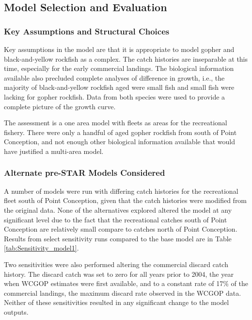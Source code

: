 \documentclass[12pt,]{article}
\begin{document}
\subsection{Model Selection and
Evaluation}\label{model-selection-and-evaluation}

\subsubsection{Key Assumptions and Structural
Choices}\label{key-assumptions-and-structural-choices}

Key assumptions in the model are that it is appropriate to model gopher
and black-and-yellow rockfish as a complex. The catch histories are
inseparable at this time, especially for the early commercial landings.
The biological information available also precluded complete analyses of
difference in growth, i.e., the majority of black-and-yellow rockfish
aged were small fish and small fish were lacking for gopher rockfish.
Data from both species were used to provide a complete picture of the
growth curve.

The assessment is a one area model with fleets as areas for the
recreational fishery. There were only a handful of aged gopher rockfish
from south of Point Conception, and not enough other biological
information available that would have justified a multi-area model.

\subsubsection{Alternate pre-STAR Models
Considered}\label{alternate-pre-star-models-considered}

A number of models were run with differing catch histories for the
recreational fleet south of Point Conception, given that the catch
histories were modified from the original data. None of the alternatives
explored altered the model at any significant level due to the fact that
the recreational catches south of Point Conception are relatively small
compare to catches north of Point Conception. Results from select
sensitivity runs compared to the base model are in Table
\ref{tab:Sensitivity_model1}.

Two sensitivities were also performed altering the commercial discard
catch history. The discard catch was set to zero for all years prior to
2004, the year when WCGOP estimates were first available, and to a
constant rate of 17\% of the commercial landings, the maximum discard
rate observed in the WCGOP data. Neither of these sensitivities resulted
in any significant change to the model outputs.
\end{document}
